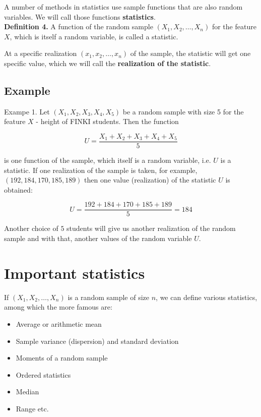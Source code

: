 \documentclass[a4paper, 12pt]{article}
\begin{document}
A number of methods in statistics use sample functions that are also random variables. We will call those functions \textbf{statistics}.\\

\textbf{Definition 4.} A function of the random sample $(X_1, X_2, \dots ,X_n)$ for the feature $X$, which is itself a random variable, is called a statistic.

At a specific realization $(x_1, x_2, \dots , x_n)$ of the sample, the statistic will get one specific value, which we will call the \textbf{realization of the statistic}.

\subsection{Example}

Exampe 1. Let $(X_1, X_2, X_3, X_4, X_5)$ be a random sample with size 5 for the feature $X$ - height of FINKI students. Then the function

\[ U = \frac{X_1 + X_2 + X_3 + X_4 + X_5}{5} \]

is one function of the sample, which itself is a random variable, i.e. $U$ is a statistic. If one realization of the sample is taken, for example, $(192, 184, 170, 185, 189)$ then one value (realization) of the statistic $U$ is obtained: 

\[ U = \frac{192+184+170+185+189}{5} = 184 \]

Another choice of $5$ students will give us another realization of the random sample and with that, another values of the random variable $U$.

\section{Important statistics}

If $(X_1, X_2, \dots ,X_n)$ is a random sample of size $n$, we can define various statistics, among which the more famous are:

\begin{itemize}
  \item Average or arithmetic mean
  \item Sample variance (dispersion) and standard deviation
  \item Moments of a random sample
  \item Ordered statistics
  \item Median
  \item Range etc.
\end{itemize}
\end{document}
